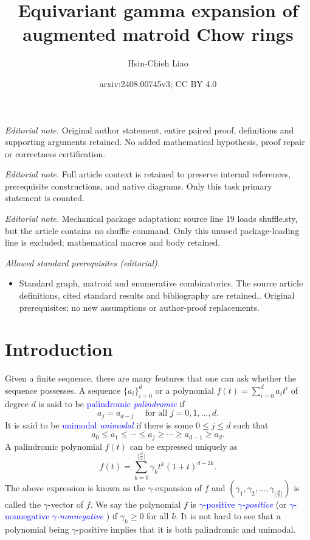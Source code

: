 \documentclass[reqno]{amsart}
\title{Equivariant gamma expansion of augmented matroid Chow rings}
\author{Hsin-Chieh Liao}
\date{arxiv:2408.00745v3; CC BY 4.0}
\newcommand{\defin}[1]{%
\relax\ifmmode%
\textcolor{blue}{#1}%
\else\textcolor{blue}{\emph{#1}}%
\fi%
}
\theoremstyle{definition}
\theoremstyle{remark}
\begin{document}
\maketitle
\noindent\textit{Editorial note.} Original author statement, entire paired proof, definitions and supporting arguments retained. No added mathematical hypothesis, proof repair or correctness certification.\par\medskip
\noindent\textit{Editorial note.} Full article context is retained to preserve internal references, prerequisite constructions, and native diagrams. Only this task primary statement is counted.\par\medskip
\noindent\textit{Editorial note.} Mechanical package adaptation: source line 19 loads shuffle.sty, but the article contains no shuffle command. Only this unused package-loading line is excluded; mathematical macros and body retained.\par\medskip
\noindent\textit{Allowed standard prerequisites (editorial).}\begin{itemize}
\item Standard graph, matroid and enumerative combinatorics. The source article definitions, cited standard results and bibliography are retained.. Original prerequisites; no new assumptions or author-proof replacements.
\end{itemize}\medskip
\section{Introduction}
Given a finite sequence, there are many features that one can ask whether the sequence possesses. A sequence $\{a_i\}_{i=0}^d$ or a polynomial $f(t)=\sum_{i=0}^d a_i t^i$ of degree $d$ is said to be \defin{palindromic} if 
\[
    a_j=a_{d-j}\quad \text{ for all } j=0,1,\ldots, d.
\]
It is said to be \defin{unimodal} if there is some $0\le j\le d$ such that 
\[
    a_0\le a_1\le\cdots\le a_j\ge\cdots\ge a_{d-1}\ge a_d.
\]
A palindromic polynomial $f(t)$ can be expressed uniquely as 
\[
    f(t)=\sum_{k=0}^{\lfloor\frac{d}{2}\rfloor}\gamma_{k}t^k(1+t)^{d-2k}.
\]
The above expression is known as the $\gamma$-expansion of $f$ and $(\gamma_1,\gamma_2,\ldots, \gamma_{\lfloor\frac{d}{2}\rfloor})$ is called the $\gamma$-vector of $f$.
We say the polynomial $f$ is \defin{$\gamma$-positive} (or \defin{$\gamma$-nonnegative}) if $\gamma_k\ge 0$ for all $k$. 
It is not hard to see that a polynomial being $\gamma$-positive implies that it is both palindromic and unimodal. 
\end{document}
